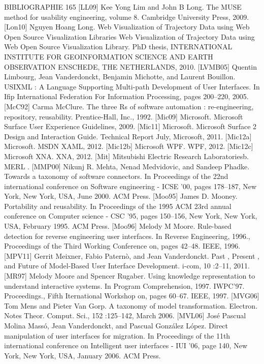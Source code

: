 \documentclass{article}
\begin{document}
BIBLIOGRAPHIE
165
[LL09]
Kee Yong Lim and John B Long. The MUSE method for usability engineering, volume 8. Cambridge University Press, 2009.
[Lon10]
Nguyen Hoang Long. Web Visualization of Trajectory Data using Web Open Source
Visualization Libraries Web Visualization of Trajectory Data using Web Open Source
Visualization Library.
PhD thesis, INTERNATIONAL INSTITUTE FOR GEOINFORMATION SCIENCE AND EARTH OBSERVATION ENSCHEDE, THE NETHERLANDS, 2010.
[LVMB05]
Quentin Limbourg, Jean Vanderdonckt, Benjamin Michotte, and Laurent Bouillon.
USIXML : A Language Supporting Multi-path Development of User Interfaces. In
Iﬁp International Federation For Information Processing, pages 200–220, 2005.
[McC92]
Carma McClure. The three Rs of software automation : re-engineering, repository,
reusability. Prentice-Hall, Inc., 1992.
[Mic09]
Microsoft. Microsoft Surface User Experience Guidelines, 2009.
[Mic11]
Microsoft. Microsoft Surface 2 Design and Interaction Guide. Technical Report July,
Microsoft, 2011.
[Mic12a]
Microsoft. MSDN XAML, 2012.
[Mic12b]
Microsoft WPF. WPF, 2012.
[Mic12c]
Microsoft XNA. XNA, 2012.
[Mit]
Mitsubishi Electric Research Laboratoriesb. MERL .
[MMP00]
Nikunj R. Mehta, Nenad Medvidovic, and Sandeep Phadke. Towards a taxonomy of
software connectors. In Proceedings of the 22nd international conference on Software
engineering - ICSE ’00, pages 178–187, New York, New York, USA, June 2000. ACM
Press.
[Moo95]
James D. Mooney. Portability and reusability. In Proceedings of the 1995 ACM 23rd
annual conference on Computer science - CSC ’95, pages 150–156, New York, New
York, USA, February 1995. ACM Press.
[Moo96]
Melody M Moore. Rule-based detection for reverse engineering user interfaces. In
Reverse Engineering, 1996., Proceedings of the Third Working Conference on, pages
42–48. IEEE, 1996.
[MPV11]
Gerrit Meixner, Fabio Paternò, and Jean Vanderdonckt. Past , Present , and Future of
Model-Based User Interface Development. i-com, 10 :2–11, 2011.
[MR97]
Melody Moore and Spencer Rugaber. Using knowledge representation to understand
interactive systems. In Program Comprehension, 1997. IWPC’97. Proceedings., Fifth
Iternational Workshop on, pages 60–67. IEEE, 1997.
[MVG06]
Tom Mens and Pieter Van Gorp. A taxonomy of model transformation. Electron. Notes
Theor. Comput. Sci., 152 :125–142, March 2006.
[MVL06]
Jos\'{e} Pascual Molina Massó, Jean Vanderdonckt, and Pascual González López. Direct
manipulation of user interfaces for migration. In Proceedings of the 11th international
conference on Intelligent user interfaces - IUI ’06, page 140, New York, New York,
USA, January 2006. ACM Press.
\end{document}
